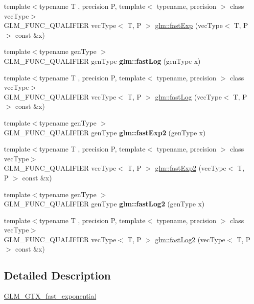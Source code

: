 \begin{DoxyCompactItemize}
{\footnotesize template$<$typename T , precision P, template$<$ typename, precision $>$ class vec\+Type$>$ }\\G\+L\+M\+\_\+\+F\+U\+N\+C\+\_\+\+Q\+U\+A\+L\+I\+F\+I\+ER vec\+Type$<$ T, P $>$ \hyperlink{group__gtx__fast__exponential_ga4faf0b61115de36efcf47c4ecb55a5fa}{glm\+::fast\+Exp} (vec\+Type$<$ T, P $>$ const \&x)
\item 
\mbox{\label{fast__exponential_8inl_a68f4f516c08702395c9b76791bab5969}} 
{\footnotesize template$<$typename gen\+Type $>$ }\\G\+L\+M\+\_\+\+F\+U\+N\+C\+\_\+\+Q\+U\+A\+L\+I\+F\+I\+ER gen\+Type {\bfseries glm\+::fast\+Log} (gen\+Type x)
\item 
{\footnotesize template$<$typename T , precision P, template$<$ typename, precision $>$ class vec\+Type$>$ }\\G\+L\+M\+\_\+\+F\+U\+N\+C\+\_\+\+Q\+U\+A\+L\+I\+F\+I\+ER vec\+Type$<$ T, P $>$ \hyperlink{group__gtx__fast__exponential_ga789abcbc34d08008d2f5a4547dd6e5e3}{glm\+::fast\+Log} (vec\+Type$<$ T, P $>$ const \&x)
\item 
\mbox{\label{fast__exponential_8inl_a2a49ccff3646c4c60938e09a06f49e50}} 
{\footnotesize template$<$typename gen\+Type $>$ }\\G\+L\+M\+\_\+\+F\+U\+N\+C\+\_\+\+Q\+U\+A\+L\+I\+F\+I\+ER gen\+Type {\bfseries glm\+::fast\+Exp2} (gen\+Type x)
\item 
{\footnotesize template$<$typename T , precision P, template$<$ typename, precision $>$ class vec\+Type$>$ }\\G\+L\+M\+\_\+\+F\+U\+N\+C\+\_\+\+Q\+U\+A\+L\+I\+F\+I\+ER vec\+Type$<$ T, P $>$ \hyperlink{group__gtx__fast__exponential_ga9e6219327b7a33077dbec7620d981fff}{glm\+::fast\+Exp2} (vec\+Type$<$ T, P $>$ const \&x)
\item 
\mbox{\label{fast__exponential_8inl_ae4f91aa04733368c8e55da6e592005d8}} 
{\footnotesize template$<$typename gen\+Type $>$ }\\G\+L\+M\+\_\+\+F\+U\+N\+C\+\_\+\+Q\+U\+A\+L\+I\+F\+I\+ER gen\+Type {\bfseries glm\+::fast\+Log2} (gen\+Type x)
\item 
{\footnotesize template$<$typename T , precision P, template$<$ typename, precision $>$ class vec\+Type$>$ }\\G\+L\+M\+\_\+\+F\+U\+N\+C\+\_\+\+Q\+U\+A\+L\+I\+F\+I\+ER vec\+Type$<$ T, P $>$ \hyperlink{group__gtx__fast__exponential_gabc46086fe6636b8be87f09e6c5d2bb58}{glm\+::fast\+Log2} (vec\+Type$<$ T, P $>$ const \&x)
\end{DoxyCompactItemize}


\subsection{Detailed Description}
\hyperlink{group__gtx__fast__exponential}{G\+L\+M\+\_\+\+G\+T\+X\+\_\+fast\+\_\+exponential} 